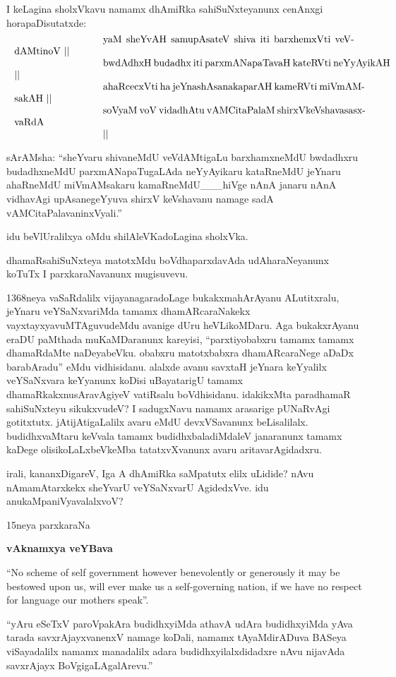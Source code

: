 \documentclass[11pt,a4size]{article}
\begin{document}
I keLagina sholxVkavu namamx dhAmiRka sahiSuNxteyanunx cenAnxgi
horapaDisutatxde:
$$
\vbox{\parskip=0pt\parindent=0pt \everypar{\hskip9em} \obeylines
yaM sheYvAH samupAsateV shiva iti barxhemxVti veVdAMtinoV ||
bwdAdhxH budadhx iti parxmANapaTavaH kateRVti neYyAyikAH ||
ahaRcecxVti ha jeYnashAsanakaparAH kameRVti miVmAMsakAH ||
soVyaM voV vidadhAtu vAMCitaPalaM shirxVkeVshavasasxvaRdA ||}
$$

sArAMsha: ``sheYvaru shivaneMdU veVdAMtigaLu barxhamxneMdU bwdadhxru
budadhxneMdU parxmANapaTugaLAda neYyAyikaru kataRneMdU jeYnaru
ahaRneMdU miVmAMsakaru kamaRneMdU\_\_\_hiVge nAnA janaru nAnA
vidhavAgi upAsanegeYyuva shirxV keVshavanu namage sadA
vAMCitaPalavaninxVyali.''

idu beVlUralilxya oMdu shilAleVKadoLagina sholxVka.

dhamaRsahiSuNxteya matotxMdu boVdhaparxdavAda udAharaNeyanunx koTuTx I
parxkaraNavanunx mugisuvevu.

1368neya vaSaRdalilx vijayanagaradoLage bukakxmahArAyanu ALutitxralu,
jeYnaru veYSaNxvariMda tamamx dhamARcaraNakekx
vayxtayxyavuMTAguvudeMdu avanige dUru heVLikoMDaru. Aga bukakxrAyanu
eraDU paMthada muKaMDaranunx kareyisi, ``parxtiyobabxru tamamx tamamx
dhamaRdaMte naDeyabeVku. obabxru matotxbabxra dhamARcaraNege aDaDx
barabAradu'' eMdu vidhisidanu. alalxde avanu savxtaH jeYnara keYyalilx
veYSaNxvara keYyanunx koDisi uBayatarigU tamamx
dhamaRkakxnusAravAgiyeV vatiRsalu boVdhisidanu. idakikxMta paradhamaR
sahiSuNxteyu sikukxvudeV? I sadugxNavu namamx arasarige pUNaRvAgi
gotitxtutx. jAtijAtigaLalilx avaru eMdU devxVSavanunx
beLisalilalx. budidhxvaMtaru keVvala tamamx budidhxbaladiMdaleV
janaranunx tamamx kaDege olisikoLaLxbeVkeMba tatatxvXvanunx avaru
aritavarAgidadxru.

irali, kananxDigareV, Iga A dhAmiRka saMpatutx elilx uLidide? nAvu
nAmamAtarxkekx sheYvarU veYSaNxvarU AgidedxVve. idu
anukaMpaniVyavalalxvoV?

\begin{center}
{\Huge 15neya parxkaraNa}

\smallskip
\textbf{\LARGE vAknamxya veYBava}
\end{center} 

{
\rm
``No scheme of self government however benevolently or generously it
may be bestowed upon us, will ever make us a self-governing nation, if
we have no respect for language our mothers speak''.}

``yAru eSeTxV paroVpakAra budidhxyiMda athavA udAra budidhxyiMda yAva
tarada savxrAjayxvanenxV namage koDali, namamx tAyaMdirADuva BASeya
viSayadalilx namamx manadalilx adara budidhxyilalxdidadxre nAvu
nijavAda savxrAjayx BoVgigaLAgalArevu.''
\end{document}
